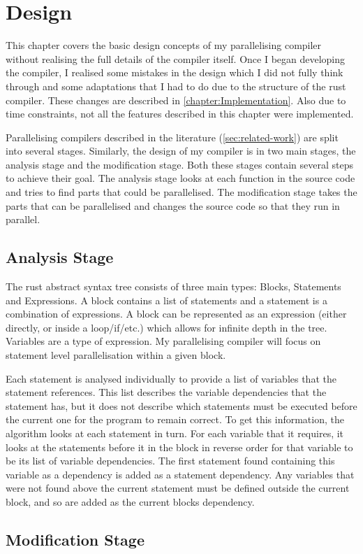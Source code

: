 \chapter{Design}
\label{chapter:Design}
This chapter covers the basic design concepts of my parallelising compiler without realising the full details of the compiler itself. Once I began developing the compiler, I realised some mistakes in the design which I did not fully think through and some adaptations that I had to do due to the structure of the rust compiler. These changes are described in \autoref{chapter:Implementation}. Also due to time constraints, not all the features described in this chapter were implemented.

Parallelising compilers described in the literature (\autoref{sec:related-work}) are split into several stages. Similarly, the design of my compiler is in two main stages, the analysis stage and the modification stage. Both these stages contain several steps to achieve their goal. The analysis stage looks at each function in the source code and tries to find parts that could be parallelised. The modification stage takes the parts that can be parallelised and changes the source code so that they run in parallel.

\section{Analysis Stage}
The rust abstract syntax tree consists of three main types: Blocks, Statements and Expressions. A block contains a list of statements and a statement is a combination of expressions. A block can be represented as an expression (either directly, or inside a loop/if/etc.) which allows for infinite depth in the tree. Variables are a type of expression. My parallelising compiler will focus on statement level parallelisation within a given block.

Each statement is analysed individually to provide a list of variables that the statement references. This list describes the variable dependencies that the statement has, but it does not describe which statements must be executed before the current one for the program to remain correct. To get this information, the algorithm looks at each statement in turn. For each variable that it requires, it looks at the statements before it in the block in reverse order for that variable to be its list of variable dependencies. The first statement found containing this variable as a dependency is added as a statement dependency. Any variables that were not found above the current statement must be defined outside the current block, and so are added as the current blocks dependency.

\section{Modification Stage}
